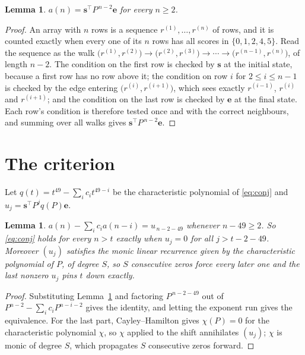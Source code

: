 \documentclass[11pt,a4paper]{article}
\theoremstyle{plain}
\newtheorem{lemma}[theorem]{Lemma}
\theoremstyle{definition}
\begin{document}
\begin{lemma}\label{lem:walk}
$a(n)=\mathbf{s}^{\!\top}P^{\,n-2}\mathbf{e}$ for every $n\ge2$.
\end{lemma}

\begin{proof}
An array with $n$ rows is a sequence $r^{(1)},\dots,r^{(n)}$ of rows, and it is counted
exactly when every one of its $n$ rows has all scores in $\{0,1,2,4,5\}$. Read the sequence as the
walk $\bigl(r^{(1)},r^{(2)}\bigr)\to\bigl(r^{(2)},r^{(3)}\bigr)\to\cdots\to
\bigl(r^{(n-1)},r^{(n)}\bigr)$, of length $n-2$. The condition on the first row is
checked by $\mathbf{s}$ at the initial state, because a first row has no row above it; the
condition on row $i$ for $2\le i\le n-1$ is checked by the edge entering
$\bigl(r^{(i)},r^{(i+1)}\bigr)$, which sees exactly $r^{(i-1)}$, $r^{(i)}$ and
$r^{(i+1)}$; and the condition on the last row is checked by $\mathbf{e}$ at the final
state. Each row's condition is therefore tested once and with the correct neighbours, and
summing over all walks gives $\mathbf{s}^{\!\top}P^{\,n-2}\mathbf{e}$.
\end{proof}

\section{The criterion}

Let $q(t)=t^{49}-\sum_i c_i t^{49-i}$ be the characteristic polynomial of
\eqref{eq:conj} and $u_j=\mathbf{s}^{\!\top}P^{j}q(P)\mathbf{e}$.

\begin{lemma}\label{lem:crit}
$a(n)-\sum_i c_i a(n-i)=u_{\,n-2-49}$ whenever $n-49\ge2$. So \eqref{eq:conj}
holds for every $n>t$ exactly when $u_j=0$ for all $j>t-2-49$. Moreover $(u_j)$
satisfies the monic linear recurrence given by the characteristic polynomial of $P$, of
degree $S$, so $S$ consecutive zeros force every later one and the last nonzero $u_j$ pins
$t$ down exactly.
\end{lemma}

\begin{proof}
Substituting Lemma~\ref{lem:walk} and factoring $P^{\,n-2-49}$ out of
$P^{n-2}-\sum_i c_i P^{n-i-2}$ gives the identity, and letting the exponent run gives the
equivalence. For the last part, Cayley--Hamilton gives $\chi(P)=0$ for the characteristic
polynomial $\chi$, so $\chi$ applied to the shift annihilates $(u_j)$; $\chi$ is monic of
degree $S$, which propagates $S$ consecutive zeros forward.
\end{proof}
\end{document}
